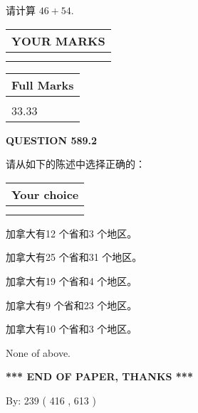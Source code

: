 \documentclass{ctexart}
\begin{document}
  
 
请计算 $ %
46 +  %
54 $.
 

 

 
  
\vspace{0.2in}
  
\noindent\begin{tabular}{|l|}
\hline
 YOUR MARKS  \\
\hline
 \\ 
 \\ 
\hline
\end{tabular}
\hspace{0.05in} \begin{tabular}{|l|}
\hline
 Full Marks  \\
\hline
 \\ 
33.33 \\
\hline
\end{tabular}
{\textbf{\Large{QUESTION
589.2 
}}}
  
  
请从如下的陈述中选择正确的：
  
  
\noindent\hspace{3.0in} \begin{tabular}{|l|}
\hline
Your choice \\
\hline
 \\ 
 \\ 
\hline
\end{tabular}
  
  
 
 
加拿大有12 个省和3 个地区。
 
 
加拿大有25 个省和31 个地区。
 
 
加拿大有19 个省和4 个地区。
 
 
加拿大有9 个省和23 个地区。
 
 
加拿大有10 个省和3 个地区。
 
 
 None of above.
 
 
   
   
 \vspace{0.2in}
 
   
   
   
   
\vspace{1.0in} 
{\textbf{\large{ *** END OF PAPER, THANKS *** }}} 
   
   
\hspace{1.0in} By: 
 239 ( 416 ,  613 )
   
\end{document}
